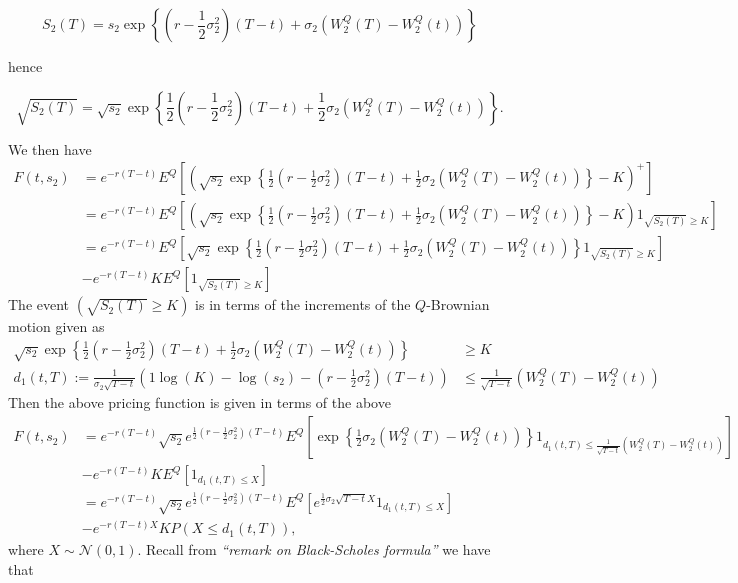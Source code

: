 \documentclass[a4paper,12pt,openany]{book}
\begin{document}
\[
S_2(T)=s_2\exp\left\{\left(r-\frac{1}{2}\sigma_2^2\right)(T-t)+\sigma_2(W_2^Q(T)-W_2^Q(t))\right\}
\]

hence

\[
\sqrt{S_2(T)}=\sqrt{s_2}\exp\left\{\frac{1}{2}\left(r-\frac{1}{2}\sigma_2^2\right)(T-t)+\frac{1}{2}\sigma_2(W_2^Q(T)-W_2^Q(t))\right\}.
\]

We then have
\begin{align*}
F(t,s_2)&=e^{-r(T-t)}E^Q\left[\left(\sqrt{s_2}\exp\left\{\frac{1}{2}\left(r-\frac{1}{2}\sigma_2^2\right)(T-t)+\frac{1}{2}\sigma_2(W_2^Q(T)-W_2^Q(t))\right\}-K\right)^+\right]\\
&=e^{-r(T-t)}E^Q\left[\left(\sqrt{s_2}\exp\left\{\frac{1}{2}\left(r-\frac{1}{2}\sigma_2^2\right)(T-t)+\frac{1}{2}\sigma_2(W_2^Q(T)-W_2^Q(t))\right\}-K\right)1_{\sqrt{S_2(T)}\ge K}\right]\\
&=e^{-r(T-t)}E^Q\left[\sqrt{s_2}\exp\left\{\frac{1}{2}\left(r-\frac{1}{2}\sigma_2^2\right)(T-t)+\frac{1}{2}\sigma_2(W_2^Q(T)-W_2^Q(t))\right\}1_{\sqrt{S_2(T)}\ge K}\right]\\
&-e^{-r(T-t)}KE^Q\left[1_{\sqrt{S_2(T)}\ge K}\right]
\end{align*}
The event \((\sqrt{S_2(T)}\ge K)\) is in terms of the increments of the \(Q\)-Brownian motion given as
\begin{align*}
\sqrt{s_2}\exp\left\{\frac{1}{2}\left(r-\frac{1}{2}\sigma_2^2\right)(T-t)+\frac{1}{2}\sigma_2(W_2^Q(T)-W_2^Q(t))\right\}&\ge K\\
d_1(t,T):=\frac{1}{\sigma_2\sqrt{T-t}}\left(1\log(K)-\log(s_2)-\left(r-\frac{1}{2}\sigma_2^2\right)(T-t)\right)&\le \frac{1}{\sqrt{T-t}}\left(W_2^Q(T)-W_2^Q(t)\right)
\end{align*}
Then the above pricing function is given in terms of the above
\begin{align*}
F(t,s_2)&=e^{-r(T-t)}\sqrt{s_2}e^{\frac{1}{2}\left(r-\frac{1}{2}\sigma_2^2\right)(T-t)}E^Q\left[\exp\left\{\frac{1}{2}\sigma_2(W_2^Q(T)-W_2^Q(t))\right\}1_{d_1(t,T)\le \frac{1}{\sqrt{T-t}}\left(W_2^Q(T)-W_2^Q(t)\right)}\right]\\
&-e^{-r(T-t)}KE^Q\left[1_{d_1(t,T)\le X}\right]\\
&=e^{-r(T-t)}\sqrt{s_2}e^{\frac{1}{2}\left(r-\frac{1}{2}\sigma_2^2\right)(T-t)}E^Q\left[e^{\frac{1}{2}\sigma_2\sqrt{T-t}X}1_{d_1(t,T)\le X}\right]\\
&-e^{-r(T-t)X}KP\left(X\le d_1(t,T)\right),
\end{align*}
where \(X\sim\mathcal{N}(0,1)\). Recall from \emph{``remark on Black-Scholes formula''} we have that
\end{document}
